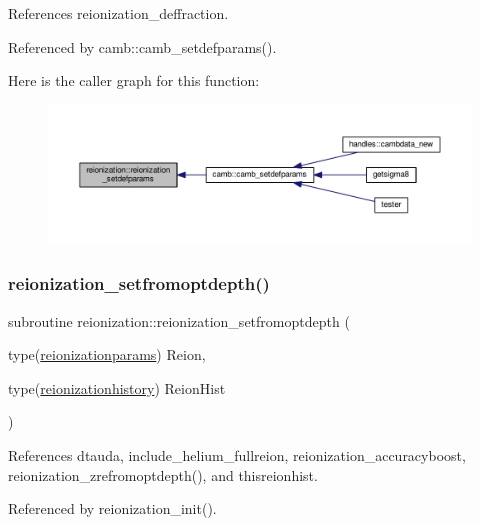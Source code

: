 References reionization\+\_\+deffraction.



Referenced by camb\+::camb\+\_\+setdefparams().

Here is the caller graph for this function\+:
\nopagebreak
\begin{figure}[H]
\begin{center}
\leavevmode
\includegraphics[width=350pt]{namespacereionization_acd4c0417f4ec9bc6d5c9b6bea2b7b035_icgraph}
\end{center}
\end{figure}
\mbox{\label{namespacereionization_a13fb01c3cb03034262b0447b7527aae9}} 
\subsubsection{\texorpdfstring{reionization\+\_\+setfromoptdepth()}{reionization\_setfromoptdepth()}}
{\footnotesize\ttfamily subroutine reionization\+::reionization\+\_\+setfromoptdepth (\begin{DoxyParamCaption}\item[{type(\mbox{\hyperlink{structreionization_1_1reionizationparams}{reionizationparams}})}]{Reion,  }\item[{type(\mbox{\hyperlink{structreionization_1_1reionizationhistory}{reionizationhistory}})}]{Reion\+Hist }\end{DoxyParamCaption})}



References dtauda, include\+\_\+helium\+\_\+fullreion, reionization\+\_\+accuracyboost, reionization\+\_\+zrefromoptdepth(), and thisreionhist.



Referenced by reionization\+\_\+init().

